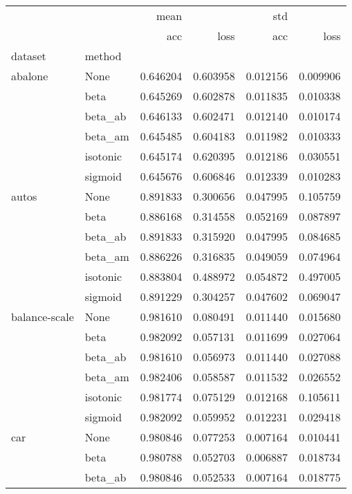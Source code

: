 \begin{tabular}{llrrrr}
\toprule
        &      &      mean &           &       std &           \\
        &      &       acc &      loss &       acc &      loss \\
dataset & method &           &           &           &           \\
\midrule
abalone & None &  0.646204 &  0.603958 &  0.012156 &  0.009906 \\
        & beta &  0.645269 &  0.602878 &  0.011835 &  0.010338 \\
        & beta\_ab &  0.646133 &  0.602471 &  0.012140 &  0.010174 \\
        & beta\_am &  0.645485 &  0.604183 &  0.011982 &  0.010333 \\
        & isotonic &  0.645174 &  0.620395 &  0.012186 &  0.030551 \\
        & sigmoid &  0.645676 &  0.606846 &  0.012339 &  0.010283 \\
autos & None &  0.891833 &  0.300656 &  0.047995 &  0.105759 \\
        & beta &  0.886168 &  0.314558 &  0.052169 &  0.087897 \\
        & beta\_ab &  0.891833 &  0.315920 &  0.047995 &  0.084685 \\
        & beta\_am &  0.886226 &  0.316835 &  0.049059 &  0.074964 \\
        & isotonic &  0.883804 &  0.488972 &  0.054872 &  0.497005 \\
        & sigmoid &  0.891229 &  0.304257 &  0.047602 &  0.069047 \\
balance-scale & None &  0.981610 &  0.080491 &  0.011440 &  0.015680 \\
        & beta &  0.982092 &  0.057131 &  0.011699 &  0.027064 \\
        & beta\_ab &  0.981610 &  0.056973 &  0.011440 &  0.027088 \\
        & beta\_am &  0.982406 &  0.058587 &  0.011532 &  0.026552 \\
        & isotonic &  0.981774 &  0.075129 &  0.012168 &  0.105611 \\
        & sigmoid &  0.982092 &  0.059952 &  0.012231 &  0.029418 \\
car & None &  0.980846 &  0.077253 &  0.007164 &  0.010441 \\
        & beta &  0.980788 &  0.052703 &  0.006887 &  0.018734 \\
        & beta\_ab &  0.980846 &  0.052533 &  0.007164 &  0.018775 \\

\end{tabular}
